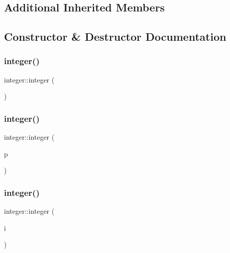 \subsection*{Additional Inherited Members}


\subsection{Constructor \& Destructor Documentation}
\mbox{\label{classinteger_a48a0c2e70d6c116c058e19c4cb546aed}} 
\subsubsection{\texorpdfstring{integer()}{integer()}\hspace{0.1cm}{\footnotesize\ttfamily [1/4]}}
{\footnotesize\ttfamily integer\+::integer (\begin{DoxyParamCaption}{ }\end{DoxyParamCaption})}

\mbox{\label{classinteger_a2d9b863abf3f285182954a852cd6c629}} 
\subsubsection{\texorpdfstring{integer()}{integer()}\hspace{0.1cm}{\footnotesize\ttfamily [2/4]}}
{\footnotesize\ttfamily integer\+::integer (\begin{DoxyParamCaption}\item[{\mbox{\hyperlink{galois_8h_ab6cc7b4aeb6ea31aba2b3fbfc83ff5e6}{B\+Y\+TE}} $\ast$}]{p }\end{DoxyParamCaption})}

\mbox{\label{classinteger_a94fbe85c84fa9a8b9ccad5948f94f780}} 
\subsubsection{\texorpdfstring{integer()}{integer()}\hspace{0.1cm}{\footnotesize\ttfamily [3/4]}}
{\footnotesize\ttfamily integer\+::integer (\begin{DoxyParamCaption}\item[{\mbox{\hyperlink{galois_8h_a09fddde158a3a20bd2dcadb609de11dc}{I\+NT}}}]{i }\end{DoxyParamCaption})}

